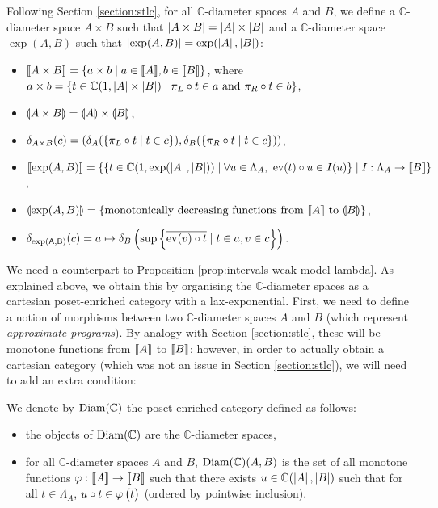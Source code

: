 Following Section \ref{section:stlc}, for all $\mathbb{C}$-diameter spaces $A$ and $B$, we define a $\mathbb{C}$-diameter space $A \times B$ such that $\left\vert A \times B\right\vert = \left\vert A\right\vert \times \left\vert B\right\vert$ and a $\mathbb{C}$-diameter space $\exp(A,B)$ such that $\left\vert\exp(A,B)\right\vert = \exp(\left\vert A\right\vert,\left\vert B\right\vert)$: \begin{itemize}
\item $\llbracket A \times B \rrbracket = \{ a \times b \mid a \in \llbracket A \rrbracket, b \in \llbracket B \rrbracket \} $, where $a \times b = \{ t \in \mathbb{C}(1, \left\vert A\right\vert \times \left\vert B\right\vert) \mid \pi_L \circ t \in a \text{ and } \pi_R \circ t \in b \}$,
\item $\llparenthesis A \times B \rrparenthesis = \llparenthesis A \rrparenthesis \times \llparenthesis B \rrparenthesis$,
\item $\delta_{A \times B}(c) = (\delta_A(\{ \pi_L \circ t \mid t \in c \}), \delta_B(\{ \pi_R \circ t \mid t \in c \}))$,
\item $\llbracket \exp(A, B) \rrbracket = \{ \{ t \in \mathbb{C}(1, \exp(\left\vert A\right\vert, \left\vert B\right\vert)) \mid \forall u \in \Lambda_{A},~ \operatorname{ev}(t) \circ u \in I(u) \} \mid I : \Lambda_A \to \llbracket B \rrbracket \}$,
\item $\llparenthesis \exp(A, B) \rrparenthesis = \{ \text{monotonically decreasing functions from } \llbracket A \rrbracket \text{ to } \llparenthesis B \rrparenthesis \}$,
\item $\delta_\mathsf{\exp(A, B)}(c) = a \mapsto \delta_B\left(\sup\left\{\overline{\operatorname{ev}(v) \circ t} \mid t\in a, v \in c\right\}\right).$
\end{itemize}

We need a counterpart to Proposition \ref{prop:intervals-weak-model-lambda}. As explained above, we obtain this by organising the $\mathbb{C}$-diameter spaces as a cartesian poset-enriched category with a lax-exponential. First, we need to define a notion of morphisms between two $\mathbb{C}$-diameter spaces $A$ and $B$ (which represent \emph{approximate programs}). By analogy with Section \ref{section:stlc}, these will be monotone functions from $\llbracket A \rrbracket$ to $\llbracket B \rrbracket$; however, in order to actually obtain a cartesian category (which was not an issue in Section \ref{section:stlc}), we will need to add an extra condition:

\begin{definition}
We denote by $\operatorname{Diam}(\mathbb{C})$ the poset-enriched category defined as follows: \begin{itemize}
\item the objects of $\operatorname{Diam}(\mathbb{C})$ are the $\mathbb{C}$-diameter spaces,
\item for all $\mathbb{C}$-diameter spaces $A$ and $B$, $\operatorname{Diam}(\mathbb{C})(A,B)$ is the set of all monotone functions $\varphi : \llbracket A \rrbracket \to \llbracket B \rrbracket$ such that there exists $u \in \mathbb{C}(\left\vert A\right\vert,\left\vert B\right\vert)$ such that for all $t \in \Lambda_A$, $u \circ t \in \varphi\left(\overline{t}\right)$ (ordered by pointwise inclusion).
\end{itemize}
\end{definition}

